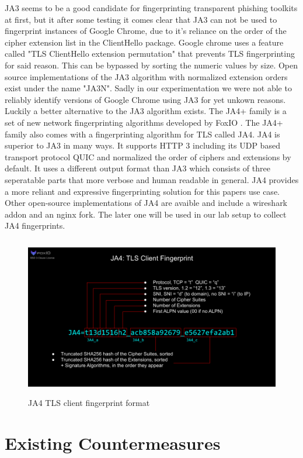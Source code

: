 \documentclass[12pt]{scrbook}
\begin{document}
JA3 seems to be
a good candidate for fingerprinting transparent phishing toolkits at first,
but it after some testing it comes clear that JA3 can not be used to
fingerprint instances of Google Chrome, due to it's reliance on the order of
the cipher extension list in the ClientHello package. Google chrome uses a
feature called "TLS ClientHello extension permutation" that prevents TLS
fingerprinting for said reason. This can be bypassed by sorting the numeric
values by size. Open source implementations of the JA3 algorithm with
normalized extension orders exist under the name "JA3N". Sadly in our
experimentation we were not able to reliably identify versions of Google
Chrome using JA3 for yet unkown reasons.
Luckily a better alternative
to the JA3 algorithm exists. The JA4+ family is a set of new network
fingerprinting algorithms developed by FoxIO \cite{foxIOJa4}. The JA4+
family also comes with a fingerprinting algorithm for TLS called JA4. JA4 is
superior to JA3 in many ways. It supports HTTP 3 including its UDP based
transport protocol QUIC and normalized the order of ciphers and extensions
by default. It uses a different output format than JA3 which consists of
three seperatable parts that more verbose and human readable in general. JA4
provides a more reliant and expressive fingerprinting solution for this
papers use case. Other open-source implementations of JA4 are avaible and
include a wireshark addon and an nginx fork. The later one will be used in
our lab setup to collect JA4 fingerprints.

\begin{figure}[!htb] \centering
	\includegraphics[height=7cm]{./images/JA4.png} \caption{JA4 TLS client
		fingerprint format} \end{figure}

\newpage
\section{Existing Countermeasures}
\end{document}

